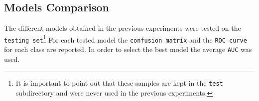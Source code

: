 \documentclass[11pt,a4paper]{article}
\begin{document}
\subsection{Models Comparison}
The different models obtained in the previous experiments were tested on the \texttt{testing set}\footnote{It is important to point out that these samples are kept in the \texttt{test} subdirectory and were never used in the previous experiments.} For each tested model the \texttt{confusion matrix} and the \texttt{ROC curve} for each class are reported. In order to select the best model the average \texttt{AUC} was used.
\begin{figure}[H]
    \centering
\end{figure}
\end{document}
